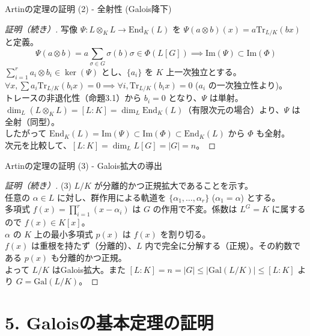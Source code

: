 \documentclass[aspectratio=169,11pt,unicode]{beamer}
\begin{document}
\begin{frame}{Artinの定理の証明 (2) - 全射性 (Galois降下)}
\begin{proof}[証明（続き）]
写像 $\Psi: L \otimes_K L \to \mathrm{End}_K(L)$ を $\Psi(a \otimes b)(x) = a \mathrm{Tr}_{L/K}(bx)$ と定義。
\[ \Psi(a \otimes b) = a \sum_{\sigma \in G} \sigma(b) \sigma \in \Phi(L[G]) \implies \mathrm{Im}(\Psi) \subset \mathrm{Im}(\Phi) \]
$\sum_{i=1}^r a_i \otimes b_i \in \ker(\Psi)$ とし、$\{a_i\}$ を $K$ 上一次独立とする。\\
$\forall x, \sum a_i \mathrm{Tr}_{L/K}(b_i x) = 0 \implies \forall i, \mathrm{Tr}_{L/K}(b_i x) = 0$ ($a_i$ の一次独立性より)。\\
トレースの非退化性（命題3.1）から $b_i = 0$ となり、$\Psi$ は単射。\\
$\dim_L (L \otimes_K L) = [L:K] = \dim_L \mathrm{End}_K(L)$（有限次元の場合）より、$\Psi$ は全射（同型）。\\
したがって $\mathrm{End}_K(L) = \mathrm{Im}(\Psi) \subset \mathrm{Im}(\Phi) \subset \mathrm{End}_K(L)$ から $\Phi$ も全射。\\
次元を比較して、$[L:K] = \dim_L L[G] = |G| = n$。
\end{proof}
\end{frame}

\begin{frame}{Artinの定理の証明 (3) - Galois拡大の導出}
\begin{proof}[証明（続き）]
(3) $L/K$ が分離的かつ正規拡大であることを示す。\\
任意の $\alpha \in L$ に対し、群作用による軌道を $\{\alpha_1, \dots, \alpha_r\}$ ($\alpha_1=\alpha$) とする。\\
多項式 $f(x) = \prod_{i=1}^r (x - \alpha_i)$ は $G$ の作用で不変。係数は $L^G = K$ に属するので $f(x) \in K[x]$。\\
$\alpha$ の $K$ 上の最小多項式 $p(x)$ は $f(x)$ を割り切る。\\
$f(x)$ は重根を持たず（分離的）、$L$ 内で完全に分解する（正規）。その約数である $p(x)$ も分離的かつ正規。\\
よって $L/K$ はGalois拡大。また $[L:K] = n = |G| \le |\mathrm{Gal}(L/K)| \le [L:K]$ より $G = \mathrm{Gal}(L/K)$。
\end{proof}
\end{frame}

\section{5. Galoisの基本定理の証明}
\end{document}
